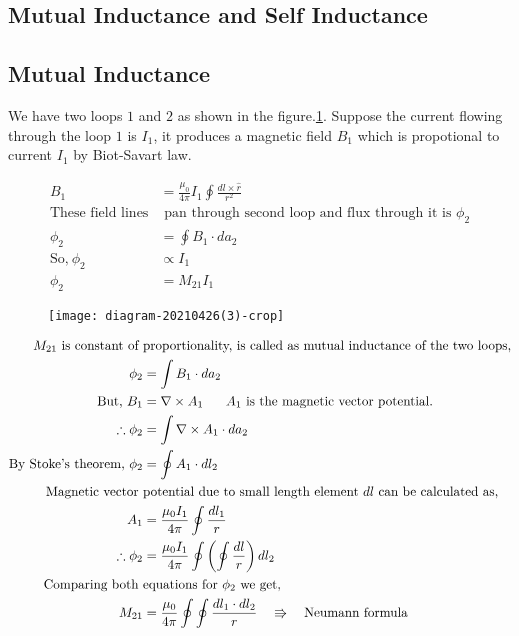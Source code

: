 \subsection{Mutual Inductance and Self Inductance}
\subsection{Mutual Inductance}
We have two loops $1$ and $2$ as shown in the figure.\ref{mutual inductance}. Suppose the current flowing through the loop $1$ is $I_1$, it produces a magnetic field $B_1$ which is propotional to current $I_1$ by Biot-Savart law.\\
\begin{minipage}{0.65\textwidth}
	\begin{align*}
B_1&=\frac{\mu_{0}}{4\pi}I_1\oint \frac{dl \times\hat{r}}{r^2}\\
\text{These field lines}&\text{ pan through second loop and flux through it is $\phi_2$}\\
\phi_2&=\oint B_1 \cdot da_2\\
\text{So,} \ \phi_2 &\propto  I_1\\
\phi_2&=M_{21}I_1 
\end{align*}
\end{minipage}
\begin{minipage}{0.20\textwidth}
\begin{figure}[H]
	\centering
	\texttt{[image: diagram-20210426(3)-crop]}
	\caption{}
	\label{mutual inductance}
\end{figure}
\end{minipage}
\begin{align*}
\text{$M_{21}$ is constant of }&\text{proportionality, is called as mutual inductance of the two loops,}\\
\phi_2&=\int B_1\cdot da_2\\
\text{But,} \ B_1&=\nabla\times A_1 \hspace{0.6cm} 
\text{$A_1$ is the magnetic vector potential.} \\
\therefore\phi_2&=\int\nabla \times A_1\cdot da_2\\
\text{By Stoke's theorem,}\ \phi_2&=\oint A_1\cdot dl_2 \\
\text{Magnetic vector }&\text{potential due to small length element $dl$ can be calculated as,}\\
A_1&=\frac{\mu_{0} I_1}{4\pi}\oint \frac{dl_1}{r}\\
\therefore\phi_2&=\frac{\mu_{0}I_1}{4\pi}\oint\left( \oint\frac{dl}{r}\right) dl_2 \\
\text{Comparing  both }&\text{equations for $\phi_2$  we  get,}\\
M_{21}&=\frac{\mu_{0}}{4 \pi}\oint \oint \frac{dl_1 \cdot dl_2}{r}\quad\Rrightarrow\quad\text{Neumann formula}
\end{align*}

